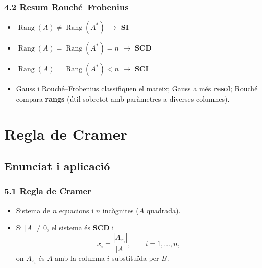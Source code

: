 \documentclass[aspectratio=169]{beamer}
\newcommand{\textverd}[1]{{\color{margueVerdFosc}#1}}
\begin{document}
\begin{frame}[t]
  \frametitle{4.2 Resum Rouché--Frobenius}

  \vspace{-0.15cm}
  \begin{caixadef}[compact]
    \begin{itemize}
      \item $\operatorname{Rang}(A)\neq\operatorname{Rang}(A^*)$ \;$\rightarrow$\; \textbf{SI}
      \item $\operatorname{Rang}(A)=\operatorname{Rang}(A^*)=n$ \;$\rightarrow$\; \textbf{SCD}
      \item $\operatorname{Rang}(A)=\operatorname{Rang}(A^*)<n$ \;$\rightarrow$\; \textbf{SCI}
    \end{itemize}
  \end{caixadef}

  \vspace{0.2cm}
  \begin{itemize}
    \item<2-> Gauss i Rouché--Frobenius classifiquen el mateix;
      Gauss a més \textbf{resol}; Rouché compara \textbf{rangs}
      (útil sobretot amb paràmetres a diverses columnes).
  \end{itemize}
\end{frame}

\section{Regla de Cramer}
\subsection{Enunciat i aplicació}

\begin{frame}[t]
  \frametitle{5.1 Regla de Cramer}

  \vspace{-0.22cm}
  \begin{itemize}
    \item<1-> Sistema de $n$ equacions i $n$ incògnites ($A$ quadrada).
    \item<2-> Si $|A|\neq 0$, el sistema és \textverd{\textbf{SCD}} i
      \[
        x_i = \frac{|A_{x_i}|}{|A|},
        \qquad i=1,\ldots,n,
      \]
      on $A_{x_i}$ és $A$ amb la columna $i$ substituïda per $B$.
  \end{itemize}

  \vspace{0.12cm}
\end{frame}
\end{document}
